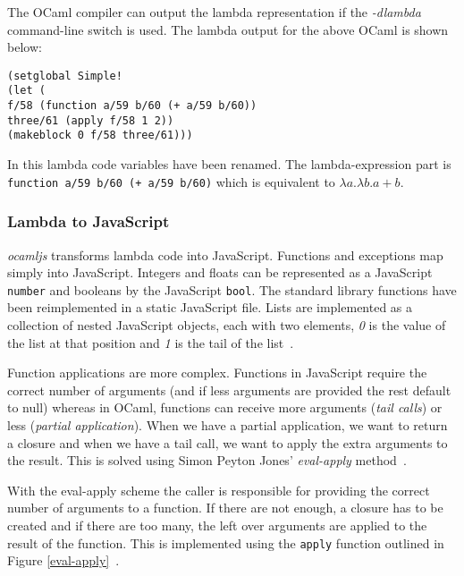 The OCaml compiler can output the lambda representation if the \emph{-dlambda} command-line switch is used. The lambda output for the above OCaml is shown below:

\begin{lstlisting}[caption={Lambda Code},label=lst:simple-lambda]
(setglobal Simple!
(let (
f/58 (function a/59 b/60 (+ a/59 b/60))
three/61 (apply f/58 1 2))
(makeblock 0 f/58 three/61)))
\end{lstlisting}

In this lambda code variables have been renamed. The lambda-expression part is \texttt{function a/59 b/60 (+ a/59 b/60)} which is equivalent to \texttt{$\lambda a.\lambda b.a+b$}.

\subsubsection{Lambda to JavaScript}
\label{lab:ocaml-js}
\emph{ocamljs} transforms lambda code into JavaScript. Functions and exceptions map simply into JavaScript. Integers and floats can be represented as a JavaScript \texttt{number} and booleans by the JavaScript \texttt{bool}. The standard library functions have been reimplemented in a static JavaScript file. Lists are implemented as a collection of nested JavaScript objects, each with two elements, \emph{0} is the value of the list at that position and \emph{1} is the tail of the list~\cite{bib:js_comp}.

Function applications are more complex. Functions in JavaScript require the correct number of arguments (and if less arguments are provided the rest default to null) whereas in OCaml, functions can receive more arguments (\emph{tail calls}) or less (\emph{partial application}). When we have a partial application, we want to return a closure and when we have a tail call, we want to apply the extra arguments to the result. This is solved using Simon Peyton Jones' \emph{eval-apply} method~\cite{bib:js_comp,bib:krivines_machine}.

\label{lab:eval-apply}
With the eval-apply scheme the caller is responsible for providing the correct number of arguments to a function. If there are not enough, a closure has to be created and if there are too many, the left over arguments are applied to the result of the function. This is implemented using the \texttt{apply} function outlined in Figure \ref{eval-apply}~\cite{bib:krivines_machine}.

